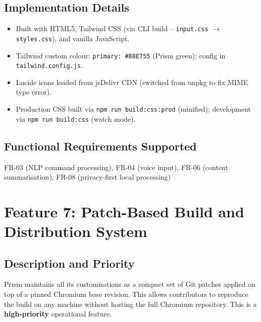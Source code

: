 \subsection{Implementation Details}
\begin{itemize}[leftmargin=*]
    \item Built with HTML5, Tailwind CSS (via CLI build -- \texttt{input.css} $\rightarrow$ \texttt{styles.css}), and vanilla JavaScript.
    \item Tailwind custom colour: \texttt{primary: \#88E755} (Prism green); config in \texttt{tailwind.config.js}.
    \item Lucide icons loaded from jsDelivr CDN (switched from unpkg to fix MIME type error).
    \item Production CSS built via \texttt{npm run build:css:prod} (minified); development via \texttt{npm run build:css} (watch mode).
\end{itemize}

\subsection{Functional Requirements Supported}
FR-03 (NLP command processing), FR-04 (voice input), FR-06 (content summarisation), FR-08 (privacy-first local processing)


\section{Feature 7: Patch-Based Build and Distribution System}

\subsection{Description and Priority}
Prism maintains all its customisations as a compact set of Git patches applied on top of a pinned Chromium base revision. This allows contributors to reproduce the build on any machine without hosting the full Chromium repository. This is a \textbf{high-priority} operational feature.

